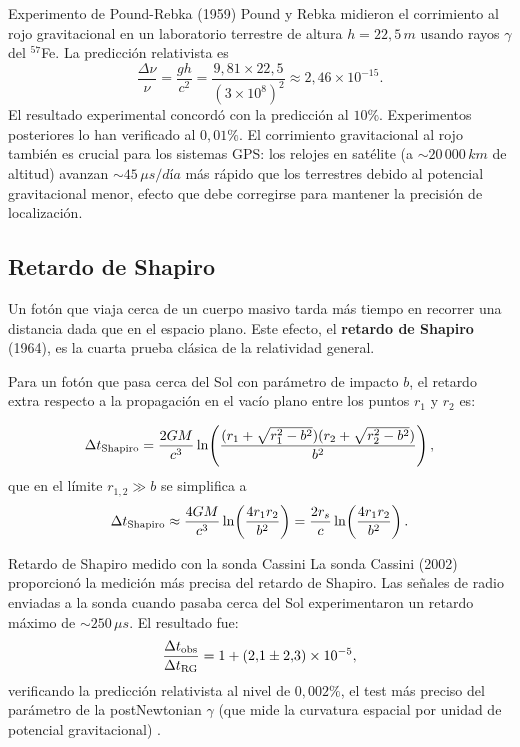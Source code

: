 \begin{ejemplo}{Experimento de Pound-Rebka (1959)}{}
Pound y Rebka midieron el corrimiento al rojo gravitacional en un laboratorio terrestre de altura $h = 22{,}5\,\si{m}$ usando rayos $\gamma$ del ${}^{57}$Fe. La predicción relativista es
\[
  \frac{\Delta\nu}{\nu} = \frac{gh}{c^2} = \frac{9{,}81 \times 22{,}5}{(3\times10^8)^2} \approx 2{,}46\times10^{-15}.
\]
El resultado experimental concordó con la predicción al $10\%$. Experimentos posteriores lo han verificado al $0{,}01\%$. El corrimiento gravitacional al rojo también es crucial para los sistemas GPS: los relojes en satélite (a $\sim 20\,000\,\si{km}$ de altitud) avanzan $\sim 45\,\si{\mu s/día}$ más rápido que los terrestres debido al potencial gravitacional menor, efecto que debe corregirse para mantener la precisión de localización.
\end{ejemplo}

\subsection{Retardo de Shapiro}

Un fotón que viaja cerca de un cuerpo masivo tarda más tiempo en recorrer una distancia dada que en el espacio plano. Este efecto, el \textbf{retardo de Shapiro} (1964), es la cuarta prueba clásica de la relatividad general.

Para un fotón que pasa cerca del Sol con parámetro de impacto $b$, el retardo extra respecto a la propagación en el vacío plano entre los puntos $r_1$ y $r_2$ es:

\begin{equation}
  \Delta t_{\rm Shapiro} = \frac{2GM}{c^3}\ln\!\left(\frac{(r_1 + \sqrt{r_1^2 - b^2})(r_2 + \sqrt{r_2^2 - b^2})}{b^2}\right),
  \label{eq:retardo_shapiro}
\end{equation}
que en el límite $r_{1,2} \gg b$ se simplifica a
\begin{equation}
  \Delta t_{\rm Shapiro} \approx \frac{4GM}{c^3}\ln\!\left(\frac{4r_1 r_2}{b^2}\right) = \frac{2r_s}{c}\ln\!\left(\frac{4r_1 r_2}{b^2}\right).
  \label{eq:retardo_shapiro_aprox}
\end{equation}

\begin{ejemplo}{Retardo de Shapiro medido con la sonda Cassini}{}
La sonda Cassini (2002) proporcionó la medición más precisa del retardo de Shapiro. Las señales de radio enviadas a la sonda cuando pasaba cerca del Sol experimentaron un retardo máximo de $\sim 250\,\si{\mu s}$. El resultado fue:
\[
  \frac{\Delta t_{\rm obs}}{\Delta t_{\rm RG}} = 1 + (2{,}1 \pm 2{,}3)\times10^{-5},
\]
verificando la predicción relativista al nivel de $0{,}002\%$, el test más preciso del parámetro de la postNewtonian $\gamma$ (que mide la curvatura espacial por unidad de potencial gravitacional) \cite{Bertotti2003}.
\end{ejemplo}

